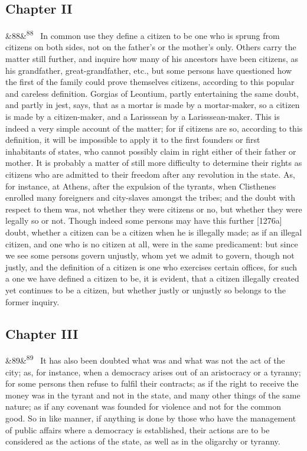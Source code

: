 \documentclass[12pt]{article}
\newcommand{\para}[1][]{\par\noindent\ifx&#1&\else\textsuperscript{\footnotesize #1}~\fi}
\begin{document}
\subsection*{Chapter II}

\para[88] In common use they define a citizen to be one who is sprung from citizens on both sides, not on the father's or the mother's only. Others carry the matter still further, and inquire how many of his ancestors have been citizens, as his grandfather, great-grandfather, etc., but some persons have questioned how the first of the family could prove themselves citizens, according to this popular and careless definition. Gorgias of Leontium, partly entertaining the same doubt, and partly in jest, says, that as a mortar is made by a mortar-maker, so a citizen is made by a citizen-maker, and a Larisssean by a Larisssean-maker. This is indeed a very simple account of the matter; for if citizens are so, according to this definition, it will be impossible to apply it to the first founders or first inhabitants of states, who cannot possibly claim in right either of their father or mother. It is probably a matter of still more difficulty to determine their rights as citizens who are admitted to their freedom after any revolution in the state. As, for instance, at Athens, after the expulsion of the tyrants, when Clisthenes enrolled many foreigners and city-slaves amongst the tribes; and the doubt with respect to them was, not whether they were citizens or no, but whether they were legally so or not. Though indeed some persons may have this further [1276a] doubt, whether a citizen can be a citizen when he is illegally made; as if an illegal citizen, and one who is no citizen at all, were in the same predicament: but since we see some persons govern unjustly, whom yet we admit to govern, though not justly, and the definition of a citizen is one who exercises certain offices, for such a one we have defined a citizen to be, it is evident, that a citizen illegally created yet continues to be a citizen, but whether justly or unjustly so belongs to the former inquiry.

\subsection*{Chapter III}

\para[89] It has also been doubted what was and what was not the act of the city; as, for instance, when a democracy arises out of an aristocracy or a tyranny; for some persons then refuse to fulfil their contracts; as if the right to receive the money was in the tyrant and not in the state, and many other things of the same nature; as if any covenant was founded for violence and not for the common good. So in like manner, if anything is done by those who have the management of public affairs where a democracy is established, their actions are to be considered as the actions of the state, as well as in the oligarchy or tyranny.
\end{document}
